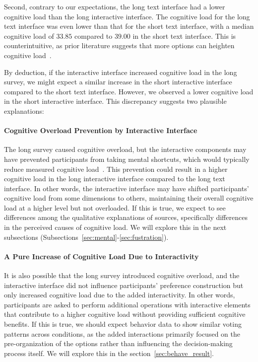 Second, contrary to our expectations, the long text interface had a lower cognitive load than the long interactive interface. The cognitive load for the long text interface was even lower than that for the short text interface, with a median cognitive load of $33.85$ compared to $39.00$ in the short text interface. This is counterintuitive, as prior literature suggests that more options can heighten cognitive load~\cite{swellerCognitiveLoadTheory2011}.

By deduction, if the interactive interface increased cognitive load in the long survey, we might expect a similar increase in the short interactive interface compared to the short text interface. However, we observed a lower cognitive load in the short interactive interface. This discrepancy suggests two plausible explanations:

\paragraph{Cognitive Overload Prevention by Interactive Interface} The long survey caused cognitive overload, but the interactive components may have prevented participants from taking mental shortcuts, which would typically reduce measured cognitive load~\cite{daniel2017thinking, simonBehavioralModelRational1955, payneAdaptiveStrategySelection1988, tverskyJudgmentsRepresentativeness}. This prevention could result in a higher cognitive load in the long interactive interface compared to the long text interface. In other words, the interactive interface may have shifted participants' cognitive load from some dimensions to others, maintaining their overall cognitive load at a higher level but not overloaded. If this is true, we expect to see differences among the qualitative explanations of sources, specifically differences in the perceived causes of cognitive load. We will explore this in the next subsections (Subsections~\ref{sec:mental}-\ref{sec:fustration}).

\paragraph{A Pure Increase of Cognitive Load Due to Interactivity} It is also possible that the long survey introduced cognitive overload, and the interactive interface did not influence participants' preference construction but only increased cognitive load due to the added interactivity. In other words, participants are asked to perform additional operations with interactive elements that contribute to a higher cognitive load without providing sufficient cognitive benefits. If this is true, we should expect behavior data to show similar voting patterns across conditions, as the added interactions primarily focused on the pre-organization of the options rather than influencing the decision-making process itself. We will explore this in the section~\ref{sec:behave_result}.

